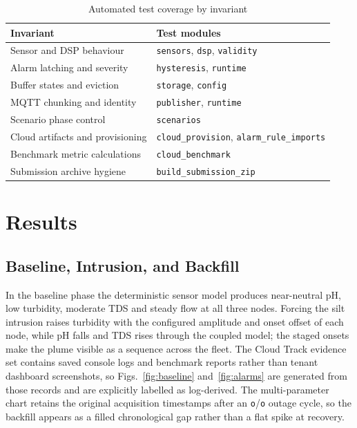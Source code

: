 \documentclass[conference]{IEEEtran}
\begin{document}
\begin{table}[t]
\caption{Automated test coverage by invariant}
\label{tab:tests}
\centering
\scriptsize
\begin{tabular}{@{}ll@{}}
\toprule
Invariant & Test modules \\
\midrule
Sensor and DSP behaviour & \texttt{sensors}, \texttt{dsp}, \texttt{validity} \\
Alarm latching and severity & \texttt{hysteresis}, \texttt{runtime} \\
Buffer states and eviction & \texttt{storage}, \texttt{config} \\
MQTT chunking and identity & \texttt{publisher}, \texttt{runtime} \\
Scenario phase control & \texttt{scenarios} \\
Cloud artifacts and provisioning & \texttt{cloud\_provision}, \texttt{alarm\_rule\_imports} \\
Benchmark metric calculations & \texttt{cloud\_benchmark} \\
Submission archive hygiene & \texttt{build\_submission\_zip} \\
\bottomrule
\end{tabular}
\end{table}

\section{Results}

\subsection{Baseline, Intrusion, and Backfill}
\label{sec:baseline}

In the baseline phase the deterministic sensor model produces near-neutral pH,
low turbidity, moderate TDS and steady flow at all three nodes. Forcing the silt
intrusion raises turbidity with the configured amplitude and onset offset of each
node, while pH falls and TDS rises through the coupled model; the staged onsets
make the plume visible as a sequence across the fleet. The Cloud Track evidence
set contains saved console logs and benchmark reports rather than tenant
dashboard screenshots, so Figs.~\ref{fig:baseline} and~\ref{fig:alarms} are
generated from those records and are explicitly labelled as log-derived. The
multi-parameter chart retains the original acquisition timestamps after an
\texttt{o}/\texttt{o} outage cycle, so the backfill appears as a filled chronological
gap rather than a flat spike at recovery.
\end{document}
